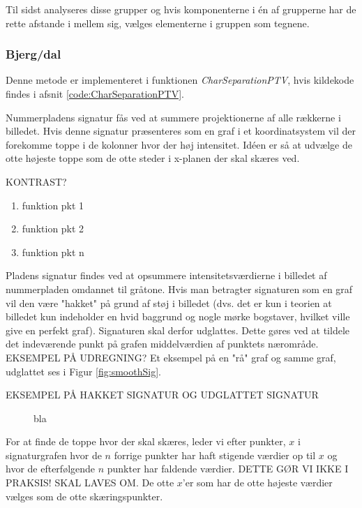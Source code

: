Til sidst analyseres disse grupper og hvis komponenterne i én af grupperne har de rette afstande i mellem sig, vælges elementerne i gruppen som tegnene.

\subsubsection*{Bjerg/dal}

Denne metode er implementeret i funktionen \textit{CharSeparationPTV}, hvis kildekode findes i afsnit \vref{code:CharSeparationPTV}.


Nummerpladens signatur fås ved at summere projektionerne af alle rækkerne i billedet. Hvis denne signatur præsenteres som en graf i et koordinatsystem vil der forekomme toppe i de kolonner hvor der høj intensitet. Idéen er så at udvælge de otte højeste toppe som de otte steder i x-planen der skal skæres ved.

KONTRAST?

\begin{enumerate}
\item funktion pkt 1
\item funktion pkt 2
\item funktion pkt n
\end{enumerate}

Pladens signatur findes ved at opsummere intensitetsværdierne i billedet af nummerpladen omdannet til gråtone. Hvis man betragter signaturen som en graf vil den være "hakket" på grund af støj i billedet (dvs. det er kun i teorien at billedet kun indeholder en hvid baggrund og nogle mørke bogstaver, hvilket ville give en perfekt graf). Signaturen skal derfor udglattes. Dette gøres ved at tildele det indeværende punkt på grafen middelværdien af punktets nærområde. EKSEMPEL PÅ UDREGNING? Et eksempel på en "rå" graf og samme graf, udglattet ses i Figur \vref{fig:smoothSig}.

EKSEMPEL PÅ HAKKET SIGNATUR OG UDGLATTET SIGNATUR

\begin{figure}[htp]
\label{fig:smoothSig}
\caption{bla}
\end{figure}

For at finde de toppe hvor der skal skæres, leder vi efter punkter, $x$ i signaturgrafen hvor de $n$ forrige punkter har haft stigende værdier op til $x$ og hvor de efterfølgende $n$ punkter har faldende værdier. DETTE GØR VI IKKE I PRAKSIS! SKAL LAVES OM. De otte $x$'er som har de otte højeste værdier vælges som de otte skæringspunkter.

